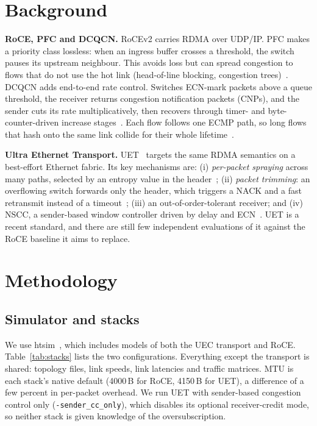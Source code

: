 \documentclass[conference]{IEEEtran}
\begin{document}
\section{Background}

\textbf{RoCE, PFC and DCQCN.}
RoCEv2 carries RDMA over UDP/IP. PFC makes a priority class lossless: when an
ingress buffer crosses a threshold, the switch pauses its upstream neighbour.
This avoids loss but can spread congestion to flows that do not use the hot
link (head-of-line blocking, congestion trees)~\cite{rdma-scale}. DCQCN adds
end-to-end rate control. Switches ECN-mark packets above a queue threshold, the
receiver returns congestion notification packets (CNPs), and the sender cuts its
rate multiplicatively, then recovers through timer- and byte-counter-driven
increase stages~\cite{dcqcn}. Each flow follows one ECMP path, so long flows that
hash onto the same link collide for their whole lifetime~\cite{hedera}.

\textbf{Ultra Ethernet Transport.}
UET~\cite{uec-spec,uec-design} targets the same RDMA semantics on a best-effort
Ethernet fabric. Its key mechanisms are:
(i) \emph{per-packet spraying} across many paths, selected by an entropy value
in the header~\cite{spray,reps};
(ii) \emph{packet trimming}: an overflowing switch forwards only the header,
which triggers a NACK and a fast retransmit instead of a timeout~\cite{ndp};
(iii) an out-of-order-tolerant receiver; and
(iv) NSCC, a sender-based window controller driven by delay and
ECN~\cite{reps}. UET is a recent standard, and there are still few independent
evaluations of it against the RoCE baseline it aims to replace.

\section{Methodology}
\label{sec:method}

\subsection{Simulator and stacks}
We use htsim~\cite{ndp}, which includes models of both the UEC transport and
RoCE. Table~\ref{tab:stacks} lists the two configurations. Everything
except the transport is shared: topology files, link speeds, link latencies and
traffic matrices. MTU is each stack's native default (4000\,B for RoCE, 4150\,B
for UET), a difference of a few percent in per-packet overhead. We run UET with
sender-based congestion control only (\texttt{-sender\_cc\_only}), which disables
its optional receiver-credit mode, so neither stack is given knowledge of the
oversubscription.
\end{document}
